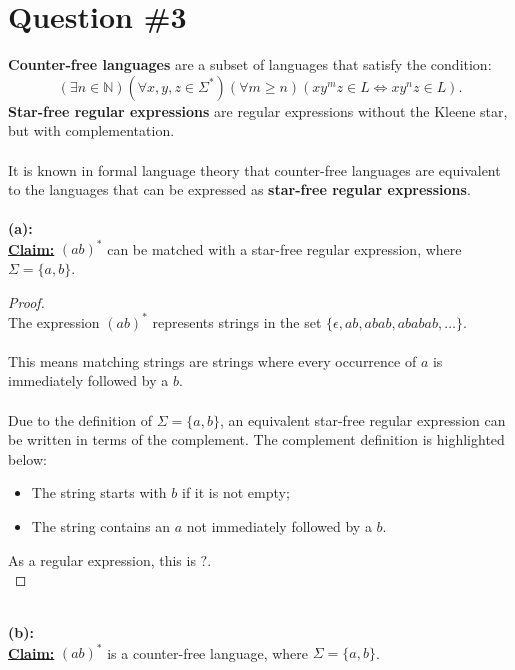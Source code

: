 \documentclass[12pt]{article}
\begin{document}
\section*{Question \#3}
\textbf{Counter-free languages} are a subset of languages that satisfy the condition:
\[
    (\exists n \in \mathbb{N})(\forall x, y, z \in \Sigma^*)(\forall m \geq n)(xy^mz \in L \iff xy^nz \in L) \text{.}
\]
\textbf{Star-free regular expressions} are regular expressions without the Kleene star, but with complementation. \\
\\
It is known in formal language theory that counter-free languages are equivalent to the languages that can be expressed as \textbf{star-free regular expressions}. \\
\\
\textbf{(a):} \\
\textbf{\underline{Claim:}} $(ab)^*$ can be matched with a star-free regular expression, where $\Sigma = \{ a, b \}$.
\begin{proof}
\leavevmode\\
    The expression $(ab)^*$ represents strings in the set $\{ \epsilon, ab, abab, ababab, \dots\}$. \\
    \\
    This means matching strings are strings where every occurrence of $a$ is immediately followed by a $b$. \\
    \\
    Due to the definition of $\Sigma = \{ a, b \} $, an equivalent star-free regular expression can be written in terms of the complement. The complement definition is highlighted below:
    \begin{itemize}
        \item The string starts with $b$ if it is not empty;
        \item The string contains an $a$ not immediately followed by a $b$.
    \end{itemize}
    As a regular expression, this is $?$. \\

\end{proof}
\leavevmode\\
\textbf{(b):} \\
\textbf{\underline{Claim:}} $(ab)^*$ is a counter-free language, where $\Sigma = \{ a, b \} $. 
\end{document}
